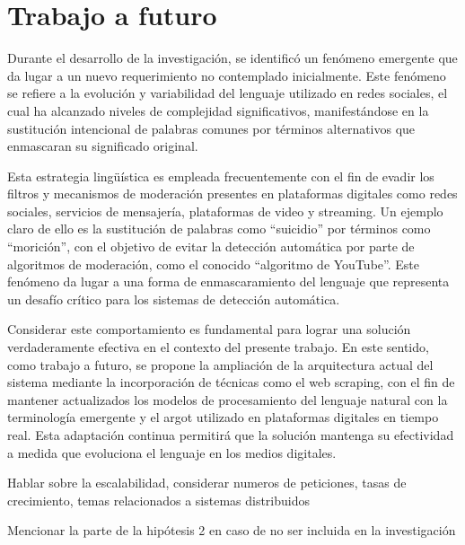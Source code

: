 \documentclass{article}
\begin{document}
\section{Trabajo a futuro}

Durante el desarrollo de la investigación, se identificó un fenómeno emergente que da lugar a un nuevo requerimiento no contemplado inicialmente. Este fenómeno se refiere a la evolución y variabilidad del lenguaje utilizado en redes sociales, el cual ha alcanzado niveles de complejidad significativos, manifestándose en la sustitución intencional de palabras comunes por términos alternativos que enmascaran su significado original.

Esta estrategia lingüística es empleada frecuentemente con el fin de evadir los filtros y mecanismos de moderación presentes en plataformas digitales como redes sociales, servicios de mensajería, plataformas de video y streaming. Un ejemplo claro de ello es la sustitución de palabras como “suicidio” por términos como “morición”, con el objetivo de evitar la detección automática por parte de algoritmos de moderación, como el conocido “algoritmo de YouTube”. Este fenómeno da lugar a una forma de enmascaramiento del lenguaje que representa un desafío crítico para los sistemas de detección automática.

Considerar este comportamiento es fundamental para lograr una solución verdaderamente efectiva en el contexto del presente trabajo. En este sentido, como trabajo a futuro, se propone la ampliación de la arquitectura actual del sistema mediante la incorporación de técnicas como el web scraping, con el fin de mantener actualizados los modelos de procesamiento del lenguaje natural con la terminología emergente y el argot utilizado en plataformas digitales en tiempo real. Esta adaptación continua permitirá que la solución mantenga su efectividad a medida que evoluciona el lenguaje en los medios digitales.

Hablar sobre la escalabilidad, considerar numeros de peticiones, tasas de crecimiento, temas relacionados a sistemas distribuidos

Mencionar la parte de la hipótesis 2 en caso de no ser incluida en la investigación
\end{document}
